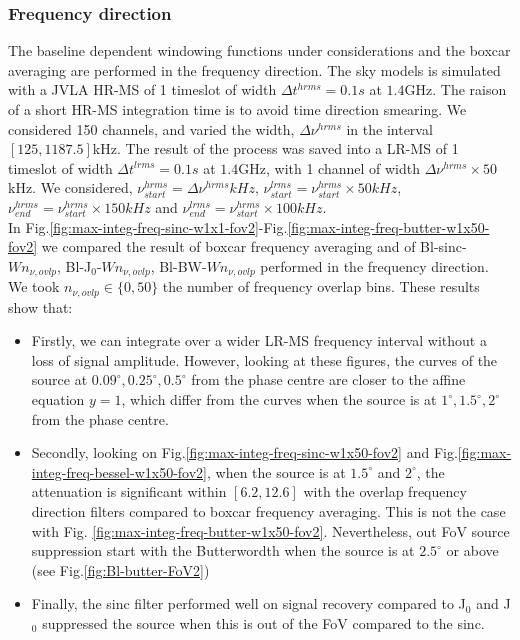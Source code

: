 \documentclass[useAMS,usenatbib]{mn2e}
\begin{document}
\subsubsection{Frequency direction}
The baseline dependent windowing functions under considerations and the boxcar averaging are performed in the frequency direction.
The sky models is simulated with a JVLA HR-MS of 1 timeslot of width $\Delta t^{hrms}=0.1s$ at $1.4$GHz. The raison of a short HR-MS 
integration time is to avoid time direction smearing. We considered 150 channels, and varied the width, $\Delta \nu^{hrms}$ in the interval 
$[125,1187.5]$kHz. The result of the process was saved into a LR-MS of 1 timeslot of width $\Delta t^{lrms}=0.1s$ at $1.4$GHz, with 1 
channel of width $\Delta \nu^{hrms}\times50$kHz. We considered, $\nu^{hrms}_{start}=\Delta \nu^{hrms}kHz$, 
$\nu^{lrms}_{start}=\nu^{hrms}_{start}\times50 kHz$, $\nu^{hrms}_{end}=\nu^{hrms}_{start}\times150 kHz$ and 
$\nu^{lrms}_{end}=\nu^{hrms}_{start}\times100 kHz$.\\
In Fig.\ref{fig:max-integ-freq-sinc-w1x1-fov2}-Fig.\ref{fig:max-integ-freq-butter-w1x50-fov2} we compared the result of boxcar frequency 
averaging and of  Bl-sinc-$W n_{\nu,ovlp}$, Bl-J$_0$-$W n_{\nu,ovlp}$, Bl-BW-$W n_{\nu,ovlp}$ performed in the frequency 
direction. We took $n_{\nu,ovlp}\in\{0,50\}$ the number of frequency overlap bins. These results show that:
\begin{itemize}
 \item Firstly,  we can integrate over a wider LR-MS frequency interval without a loss of signal 
amplitude. However, looking at these figures, the curves of the source at $0.09^{\circ},0.25^{\circ},0.5^{\circ}$ from the phase centre are 
closer to the affine equation $y=1$, which differ from the curves when the source is at $1^{\circ},1.5^{\circ}, 2^{\circ}$ from the phase 
centre.  
 \item Secondly, looking on Fig.\ref{fig:max-integ-freq-sinc-w1x50-fov2} and Fig.\ref{fig:max-integ-freq-bessel-w1x50-fov2}, when the source 
is at $1.5^{\circ}$ and $2^{\circ}$, the attenuation is significant within 
$[6.2,12.6]$ with the overlap frequency direction filters compared to boxcar frequency averaging. This is not the case with Fig.
\ref{fig:max-integ-freq-butter-w1x50-fov2}. Nevertheless, out FoV source suppression start with the Butterwordth when the source is at 
$2.5^{\circ}$ or above (see Fig.\ref{fig:Bl-butter-FoV2}) 
 \item Finally, the sinc filter performed well on signal recovery compared to J$_0$ and J$_0$ suppressed 
the source when this is out of the FoV compared to the sinc.  
\end{itemize}
\end{document}
